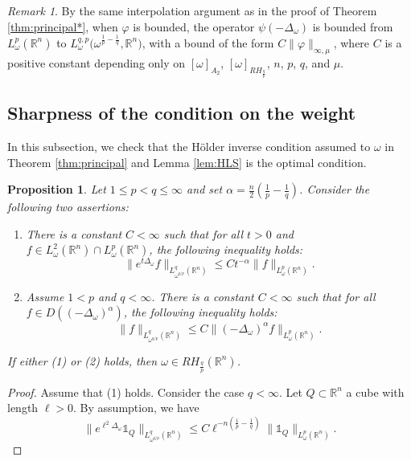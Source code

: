 \documentclass[12pt, letterpaper]{amsart}
\newtheorem{prop}[thm]{Proposition}
\theoremstyle{definition}
\theoremstyle{remark}
\newtheorem{rem}[thm]{Remark}
\numberwithin{equation}{section}
\begin{document}
{\begin{rem}
    By the same interpolation argument as in the proof of Theorem \ref{thm:principal*}, when $\varphi$ is bounded, the operator $\psi(-\Delta_\omega)$ is bounded from $L^p_\omega(\mathbb{R}^n)$ to $L^{q,p}_\omega\big(\omega^{\frac{1}{p}-\frac{1}{q}}, \mathbb{R}^n\big)$, with a bound of the form $C \|\varphi\|_{\infty, \mu}$, where $C$ is a positive constant depending only on $[\omega]_{A_2}$, $[\omega]_{RH_{\frac{q}{p}}}$, $n$, $p$, $q$, and $\mu$.
\end{rem}






\subsection{Sharpness of the condition on the weight}
In this subsection, we check that the H\"older inverse condition assumed to $\omega$ in Theorem \ref{thm:principal} and Lemma \ref{lem:HLS} is the optimal condition.
\begin{prop}
    Let $1 \le p<q \le \infty$ and set $\alpha=\frac{n}{2}(\frac{1}{p}-\frac{1}{q})$. Consider the following two assertions:
    \begin{enumerate}
        \item There is a constant $C <\infty $ such that for all $t > 0$ and $f \in L^2_\omega(\mathbb{R}^n) \cap L^p_\omega(\mathbb{R}^n)$, the following inequality holds:
    \begin{equation*}
        \| e^{t\Delta_\omega} f \|_{L^q_{{\omega}^{q/p}}(\mathbb{R}^n)} \leq C t^{-\alpha} \|  f \|_{L^p_{\omega}(\mathbb{R}^n)}.
    \end{equation*}
    \item Assume $1<p$ and $q<\infty$. There is a constant $C < \infty$ such that for all $f \in D((-\Delta_\omega)^\alpha)$, the following inequality holds:
    \begin{equation*}
        \| f \|_{L^q_{{\omega}^{q/p}}(\mathbb{R}^n)} \leq C \| (-\Delta_\omega)^\alpha f \|_{L^p_{\omega}(\mathbb{R}^n)}.
    \end{equation*}
    \end{enumerate}
    If either (1) or (2) holds, then $\omega \in RH_{\frac{q}{p}}(\mathbb{R}^n)$. 
\end{prop}
\begin{proof}
    Assume that (1) holds. Consider the case $q<\infty$. Let $Q \subset \mathbb{R}^n$ a cube with length $\ell >0$. By assumption, we have 
    $$\| e^{\ell^2\Delta_\omega} \mathbb{1}_Q \|_{L^q_{{\omega}^{q/p}}(\mathbb{R}^n)} \leq C \ell^{-n(\frac{1}{p}-\frac{1}{q})} \|  \mathbb{1}_Q \|_{L^p_{\omega}(\mathbb{R}^n)}. $$

\end{proof}}
\end{document}
